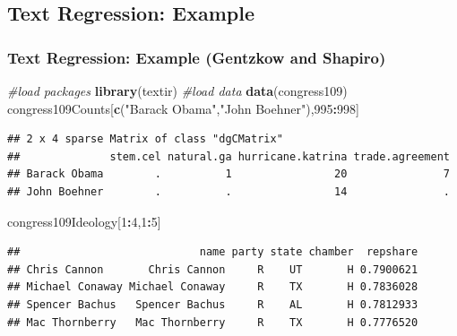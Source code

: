 \documentclass[
  shownotes,
  xcolor={svgnames},
  hyperref={colorlinks,citecolor=DarkBlue,linkcolor=DarkRed,urlcolor=DarkBlue}
  , aspectratio=169]{beamer}
\newenvironment{Shaded}{\begin{snugshade}}{\end{snugshade}}
\newcommand{\CommentTok}[1]{\textcolor[rgb]{0.56,0.35,0.01}{\textit{#1}}}
\newcommand{\DecValTok}[1]{\textcolor[rgb]{0.00,0.00,0.81}{#1}}
\newcommand{\KeywordTok}[1]{\textcolor[rgb]{0.13,0.29,0.53}{\textbf{#1}}}
\newcommand{\NormalTok}[1]{#1}
\newcommand{\OperatorTok}[1]{\textcolor[rgb]{0.81,0.36,0.00}{\textbf{#1}}}
\newcommand{\StringTok}[1]{\textcolor[rgb]{0.31,0.60,0.02}{#1}}
\begin{document}
\subsection{Text Regression: Example}
\begin{frame}[fragile]
\frametitle{Text Regression: Example (Gentzkow and Shapiro)}
\begin{scriptsize}



\begin{Shaded}
\begin{Highlighting}[]
\CommentTok{\#load packages}
\KeywordTok{library}\NormalTok{(textir) }
\CommentTok{\#load data}
\KeywordTok{data}\NormalTok{(congress109)}
\NormalTok{congress109Counts[}\KeywordTok{c}\NormalTok{(}\StringTok{"Barack Obama"}\NormalTok{,}\StringTok{"John Boehner"}\NormalTok{),}\DecValTok{995}\OperatorTok{:}\DecValTok{998}\NormalTok{]}
\end{Highlighting}
\end{Shaded}

\end{scriptsize}
\begin{tiny}


\begin{verbatim}
## 2 x 4 sparse Matrix of class "dgCMatrix"
##              stem.cel natural.ga hurricane.katrina trade.agreement
## Barack Obama        .          1                20               7
## John Boehner        .          .                14               .
\end{verbatim}

\end{tiny}
\begin{scriptsize}


\begin{Shaded}
\begin{Highlighting}[]
\NormalTok{congress109Ideology[}\DecValTok{1}\OperatorTok{:}\DecValTok{4}\NormalTok{,}\DecValTok{1}\OperatorTok{:}\DecValTok{5}\NormalTok{]}
\end{Highlighting}
\end{Shaded}
\end{scriptsize}
\begin{tiny}


\begin{verbatim}
##                            name party state chamber  repshare
## Chris Cannon       Chris Cannon     R    UT       H 0.7900621
## Michael Conaway Michael Conaway     R    TX       H 0.7836028
## Spencer Bachus   Spencer Bachus     R    AL       H 0.7812933
## Mac Thornberry   Mac Thornberry     R    TX       H 0.7776520
\end{verbatim}
\end{tiny}
\end{frame}
\end{document}

